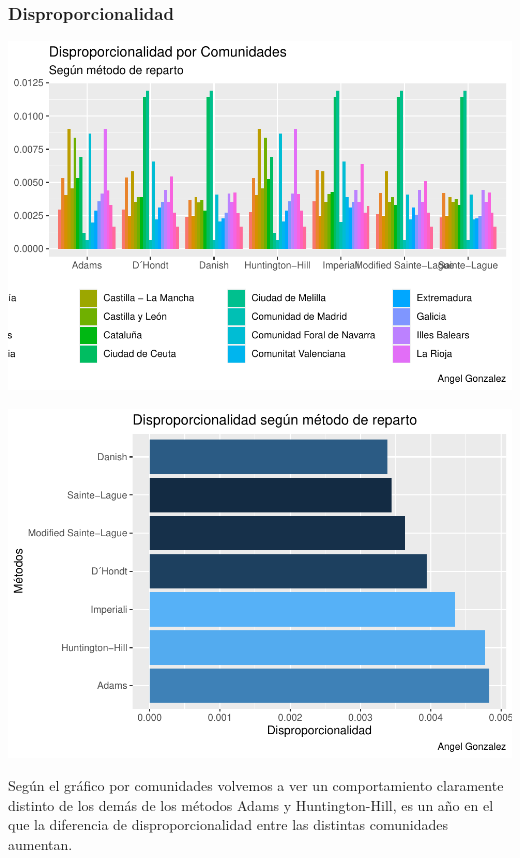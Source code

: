 \documentclass[12pt,a4paper,]{book}
\numberwithin{dummy}{section}
\theoremstyle{ocrenumbox}
\theoremstyle{blacknumex}
\theoremstyle{blacknumbox}
\theoremstyle{ocrenum}
\theoremstyle{ocrenum}
\begin{document}
\hypertarget{disproporcionalidad-10}{%
\subsubsection{Disproporcionalidad}\label{disproporcionalidad-10}}

\begin{center}\includegraphics[width=0.95\linewidth]{figurasR/unnamed-chunk-111-1} \end{center}

\begin{center}\includegraphics[width=0.95\linewidth]{figurasR/unnamed-chunk-111-2} \end{center}

Según el gráfico por comunidades volvemos a ver un comportamiento
claramente distinto de los demás de los métodos Adams y Huntington-Hill,
es un año en el que la diferencia de disproporcionalidad entre las
distintas comunidades aumentan.
\end{document}
